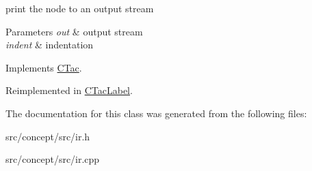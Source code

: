 print the node to an output stream 


\begin{DoxyParams}{Parameters}
{\em out} & output stream \\
\hline
{\em indent} & indentation \\
\hline
\end{DoxyParams}


Implements \hyperlink{classCTac_ab8aa1795fb3d4253faf47e760f2a9372}{C\-Tac}.



Reimplemented in \hyperlink{classCTacLabel_a45ccdb466dda48890594a82fec365e5a}{C\-Tac\-Label}.



The documentation for this class was generated from the following files\-:\begin{DoxyCompactItemize}
\item 
src/concept/src/ir.\-h\item 
src/concept/src/ir.\-cpp\end{DoxyCompactItemize}
